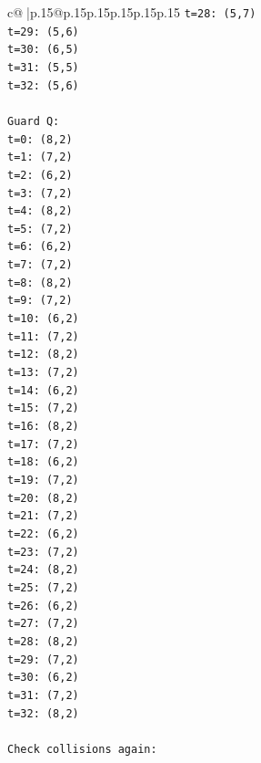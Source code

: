 \documentclass{article}
\begin{document}
{\begin{supertabular}{c@{$\;$}|p{.15\linewidth}@{}p{.15\linewidth}p{.15\linewidth}p{.15\linewidth}p{.15\linewidth}p{.15\linewidth}}
{{{\texttt{t=28: (5,7)} \\
\texttt{t=29: (5,6)} \\
\texttt{t=30: (6,5)} \\
\texttt{t=31: (5,5)} \\
\texttt{t=32: (5,6)} \\
\\ 
\texttt{Guard Q:} \\
\texttt{t=0: (8,2)} \\
\texttt{t=1: (7,2)} \\
\texttt{t=2: (6,2)} \\
\texttt{t=3: (7,2)} \\
\texttt{t=4: (8,2)} \\
\texttt{t=5: (7,2)} \\
\texttt{t=6: (6,2)} \\
\texttt{t=7: (7,2)} \\
\texttt{t=8: (8,2)} \\
\texttt{t=9: (7,2)} \\
\texttt{t=10: (6,2)} \\
\texttt{t=11: (7,2)} \\
\texttt{t=12: (8,2)} \\
\texttt{t=13: (7,2)} \\
\texttt{t=14: (6,2)} \\
\texttt{t=15: (7,2)} \\
\texttt{t=16: (8,2)} \\
\texttt{t=17: (7,2)} \\
\texttt{t=18: (6,2)} \\
\texttt{t=19: (7,2)} \\
\texttt{t=20: (8,2)} \\
\texttt{t=21: (7,2)} \\
\texttt{t=22: (6,2)} \\
\texttt{t=23: (7,2)} \\
\texttt{t=24: (8,2)} \\
\texttt{t=25: (7,2)} \\
\texttt{t=26: (6,2)} \\
\texttt{t=27: (7,2)} \\
\texttt{t=28: (8,2)} \\
\texttt{t=29: (7,2)} \\
\texttt{t=30: (6,2)} \\
\texttt{t=31: (7,2)} \\
\texttt{t=32: (8,2)} \\
\\ 
\texttt{Check collisions again:} \\
}}}
\end{supertabular}}
\end{document}
